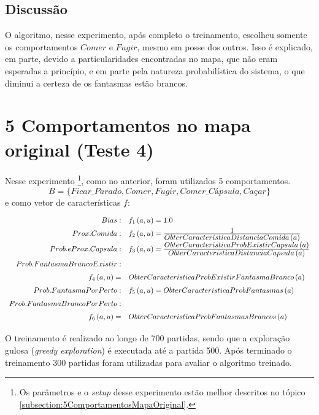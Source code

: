 \subsection{Discussão}

O algoritmo, nesse experimento, após completo o treinamento, escolheu somente os comportamentos $ Comer $ e $ Fugir $, mesmo em posse dos outros. Isso é explicado, em parte, devido a particularidades encontradas no mapa, que não eram esperadas a princípio, e em parte pela natureza probabilística do sistema, o que diminui a certeza de os fantasmas estão brancos.


\section{5 Comportamentos no mapa original (Teste 4)}

Nesse experimento%
\footnote{Os parâmetros e o \textit{setup} desse experimento estão melhor descritos no tópico \ref{subsection:5ComportamentosMapaOriginal}.%
}, como no anterior, foram utilizados 5 comportamentos. 
$$ B = \{Ficar\_Parado, Comer, Fugir, \textit{Comer\_Cápsula}, \textit{Caçar} \} $$
e como vetor de características $ f $:
\begin{equation}
\renewcommand\arraystretch{1.5}
	\begin{array}{r l}
		Bias: & f_1 \left( a, u \right) = 1.0 \\
		Prox. Comida: & f_2 \left( a, u \right) = \frac{\displaystyle 1}{\displaystyle ObterCaracteristicaDistanciaComida \left( a \right)} \\
		Prob. e Prox. Capsula: & f_3 \left( a, u \right) = \frac{\displaystyle ObterCaracteristicaProbExistirCapsula \left( a \right)}{\displaystyle ObterCaracteristicaDistanciaCapsula \left( a \right)} \\
		Prob. Fantasma Branco Existir: & \\
		f_4 \left( a, u \right) = & ObterCaracteristicaProbExistirFantasmaBranco \left( a \right) \\
		Prob. Fantasma Por Perto: & f_5 \left( a, u \right) = ObterCaracteristicaProbFantasmas \left( a \right) \\
		Prob. Fantasma Branco Por Perto: & \\
		f_6 \left( a, u \right) = & ObterCaracteristicaProbFantasmasBrancos \left( a \right)
	\end{array}
\end{equation}

O treinamento é realizado ao longo de 700 partidas, sendo que a exploração gulosa (\textit{greedy exploration}) é executada até a partida 500. Após terminado o treinamento 300 partidas foram utilizadas para avaliar o algoritmo treinado.


